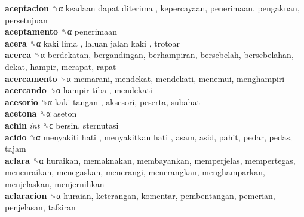 \textbf{aceptacion} ␝α   keadaan dapat diterima , kepercayaan, penerimaan, pengakuan, persetujuan  \\
\textbf{aceptamento} ␝α  penerimaan  \\
\textbf{acera} ␝α   kaki lima ,  laluan jalan kaki , trotoar  \\
\textbf{acerca} ␝α  berdekatan, bergandingan, berhampiran, bersebelah, bersebelahan, dekat, hampir, merapat, rapat  \\
\textbf{acercamento} ␝α  memarani, mendekat, mendekati, menemui, menghampiri  \\
\textbf{acercando} ␝α   hampir tiba , mendekati  \\
\textbf{acesorio} ␝α   kaki tangan , aksesori, peserta, subahat  \\
\textbf{acetona} ␝α  aseton  \\
\textbf{achin} \emph{int}  ␝ϲ  bersin, sternutasi  \\
\textbf{acido} ␝α   menyakiti hati ,  menyakitkan hati , asam, asid, pahit, pedar, pedas, tajam  \\
\textbf{aclara} ␝α  huraikan, memaknakan, membayankan, memperjelas, mempertegas, mencuraikan, menegaskan, menerangi, menerangkan, menghamparkan, menjelaskan, menjernihkan  \\
\textbf{aclaracion} ␝α  huraian, keterangan, komentar, pembentangan, pemerian, penjelasan, tafsiran  \\

